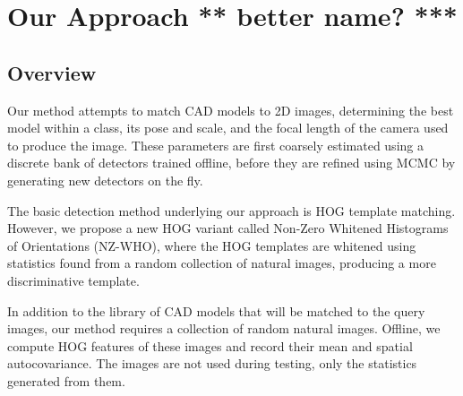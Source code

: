 \documentclass[10pt,twocolumn,letterpaper]{article}
\newcommand{\scream}[1]{{\color{red} \bf *** #1 ***}}
\begin{document}

\section{Our Approach \scream{better name?}}
\label{sec:nz-who}

\subsection{Overview}
Our method attempts to match CAD models to 2D images, determining the best model within a class, its pose and scale, and the focal length of the camera used to produce the image. These parameters are first coarsely estimated using a discrete bank of detectors trained offline, before they are refined using MCMC by generating new detectors on the fly.

The basic detection method underlying our approach is HOG template matching. However, we propose a new HOG variant called Non-Zero Whitened Histograms of Orientations (NZ-WHO), where the HOG templates are whitened using statistics found from a random collection of natural images, producing a more discriminative template.

In addition to the library of CAD models that will be matched to the query images, our method requires a collection of random natural images. Offline, we compute HOG features of these images and record their mean and spatial autocovariance. The images are not used during testing, only the statistics generated from them.
\end{document}
